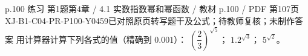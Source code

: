 \par\noindent\begin{minipage}{\linewidth}
\begin{bankitem}{p.100 练习 第1题}{第4章 / 4.1 实数指数幂和幂函数 / 教材 p.100 / PDF 第107页}{XJ-B1-C04-PR-P100-Y0459}{已对照原页转写题干及公式；待教师复核；未制作答案}
用计算器计算下列各式的值（精确到 $0.001$）：
$\left(\dfrac23\right)^{\sqrt5}$；
$1.2^{\sqrt3}$；
$5^{\sqrt2}$。
\end{bankitem}
\end{minipage}\par\medskip
